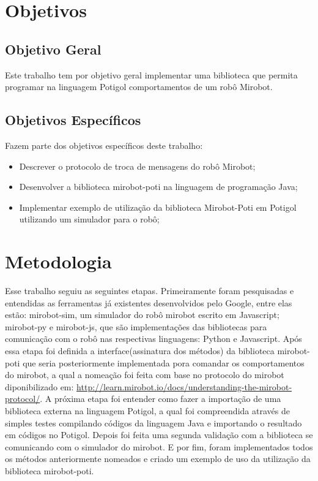 \section{Objetivos}

\subsection{Objetivo Geral}

Este trabalho tem por objetivo geral implementar uma biblioteca que permita
programar na linguagem Potigol comportamentos de um robô Mirobot.

\subsection{Objetivos Específicos}

Fazem parte dos objetivos específicos deste trabalho:

\begin{itemize}
  \item Descrever o protocolo de troca de mensagens do robô Mirobot;
  \item Desenvolver a biblioteca mirobot-poti na linguagem de
    programação Java;
  \item Implementar exemplo de utilização da biblioteca
      Mirobot-Poti em Potigol utilizando um simulador para o robô;
\end{itemize}


\section{Metodologia}

Esse trabalho seguiu as seguintes etapas. Primeiramente foram pesquisadas e
entendidas as ferramentas já existentes desenvolvidos pelo Google, entre elas estão:
mirobot-sim, um simulador do robô mirobot escrito em Javascript; mirobot-py e
mirobot-js, que são implementações das bibliotecas para comunicação com o robô
nas respectivas linguagens: Python e Javascript. 
Após essa etapa foi
definida a interface(assinatura dos métodos) da biblioteca mirobot-poti que seria
posteriormente implementada pora comandar os
comportamentos do mirobot, a qual a nomeação foi feita com base no protocolo do mirobot diponibilizado em: \url{http://learn.mirobot.io/docs/understanding-the-mirobot-protocol/}.
A próxima etapa foi entender como fazer a
importação de uma biblioteca externa na linguagem Potigol, a qual foi
compreendida através de simples testes compilando códigos da linguagem Java e
importando o resultado em códigos no Potigol. 
Depois foi feita uma
segunda validação com a biblioteca se comunicando com o simulador do mirobot. 
E por fim, foram implementados todos os métodos anteriormente
nomeados e criado um exemplo de uso da utilização da biblioteca mirobot-poti.

